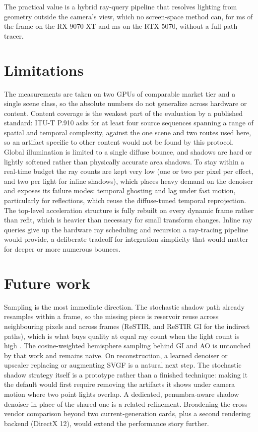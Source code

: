 The practical value is a hybrid ray-query pipeline that resolves lighting from geometry outside the
camera's view, which no screen-space method can, for \perfFourEffectsAMD{} ms of the frame on the
RX 9070 XT and \perfFourEffectsNV{} ms on the RTX 5070, without a full path tracer.

\section{Limitations}

The measurements are taken on two GPUs of comparable market tier and a single scene class, so the
absolute numbers do not generalize across hardware or content. Content coverage is the weakest part
of the evaluation by a published standard: ITU-T P.910 \cite{itu_p910} asks for at least four source
sequences spanning a range of spatial and temporal complexity, against the one scene and two routes
used here, so an artifact specific to other content would not be found by this protocol. Global illumination is limited to a
single diffuse bounce, and shadows are hard or lightly softened rather than physically accurate area
shadows. To stay within a real-time budget the ray counts are kept very low (one or two per pixel per
effect, and two per light for inline shadows),
which places heavy demand on the denoiser and exposes its failure modes: temporal ghosting and lag
under fast motion, particularly for reflections, which reuse the diffuse-tuned temporal reprojection.
The top-level acceleration structure is fully rebuilt on every dynamic frame rather than refit, which
is heavier than necessary for small transform changes. Inline ray queries give up the hardware ray
scheduling and recursion a ray-tracing pipeline would provide, a deliberate tradeoff for integration
simplicity that would matter for deeper or more numerous bounces.

\section{Future work}

Sampling is the most immediate direction. The stochastic shadow path already resamples within a
frame, so the missing piece is reservoir reuse across neighbouring pixels and across frames (ReSTIR,
and ReSTIR GI for the indirect paths), which is what buys quality at equal ray count when the light
count is high \cite{bitterli2020restir, ouyang2021restirgi}. The cosine-weighted hemisphere sampling
behind GI and AO is untouched by that work and remains naive. On reconstruction, a learned denoiser
or upscaler replacing or augmenting SVGF is a natural next step. The stochastic shadow strategy
itself is a prototype rather than a finished technique: making it the default would first require
removing the artifacts it shows under camera motion where two point lights overlap. A dedicated,
penumbra-aware shadow denoiser in place of the shared one is a related refinement. Broadening the cross-vendor comparison beyond two current-generation cards, plus a second
rendering backend (DirectX 12), would extend the performance story further.
